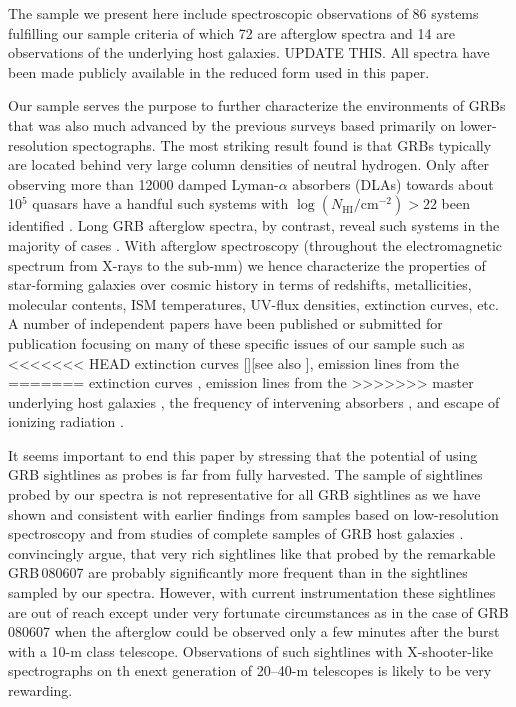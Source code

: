 \documentclass{aa}    %
\begin{document}
The sample we present here include spectroscopic observations of 86 
systems fulfilling our sample criteria of which 72 are afterglow spectra 
and 14 are observations of the underlying host galaxies. 
UPDATE THIS.
All spectra have been made publicly available in the reduced form used
in this paper.

Our sample serves the purpose to further characterize the environments of GRBs
that was also much advanced by the previous surveys based primarily on
lower-resolution spectographs. The most striking result found is that GRBs
typically are located behind very large column densities of neutral hydrogen.
Only after observing more than 12000 damped Lyman-$\alpha$ absorbers (DLAs)
towards about 10$^5$ quasars have a handful such systems with
$\log({N_\mathrm{HI}/\mathrm{cm^{-2}}}) > 22$ been identified \citep[e.g., five
in][]{Noterdaeme2012b}. Long GRB afterglow spectra, by contrast, reveal such
systems in the majority of cases \citep[][and this work]{Jakobsson2006b,
	Fynbo2009, Cucchiara2015}.  With afterglow spectroscopy (throughout the electromagnetic
spectrum from X-rays to the sub-mm) we hence characterize the properties of
star-forming galaxies over cosmic history in terms of redshifts, metallicities,
molecular contents, ISM temperatures, UV-flux densities, extinction curves,
etc.  A number of independent papers have been published or submitted for
publication focusing on many of these specific issues of our sample such as
<<<<<<< HEAD
extinction curves [][see also
\cite{Fynbo2014, Heintz2017}]\citep{Japelj2015, Zafar2017}, emission lines from the
=======
extinction curves \citep[][see also
\cite{Fynbo2014,Heintz2017}]{Japelj2015,Zafar17}, emission lines from the
>>>>>>> master
underlying host galaxies \citep{Kruhler2015}, the frequency of intervening
 absorbers \citep{Christensen2017}, and escape of ionizing
radiation \citep{Tanvir2017}.

It seems important to end this paper by stressing that the potential of 
using GRB sightlines as probes is far from fully harvested. The sample of
sightlines probed by our spectra is not representative for all GRB 
sightlines as we have shown and consistent with earlier findings
from samples based on low-resolution spectroscopy \citep[e.g.,][]{Fynbo2009}
and from studies of complete samples of GRB host galaxies 
\citep{Hjorth2012, Covino2013, Perley2016}. 
\cite{Kruhler2013} convincingly argue, that 
very rich sightlines like that probed by the remarkable GRB\,080607 
\citep{Prochaska2009} are probably significantly more frequent than in the sightlines 
sampled by our spectra. However, with current instrumentation these sightlines are
out of reach except under very fortunate circumstances as in the case of 
GRB\,080607 when the afterglow could be observed only a few minutes after the 
burst with a 10-m class telescope. Observations of such sightlines with 
X-shooter-like spectrographs on th enext generation of 20--40-m telescopes
is likely to be very rewarding. 
\end{document}
